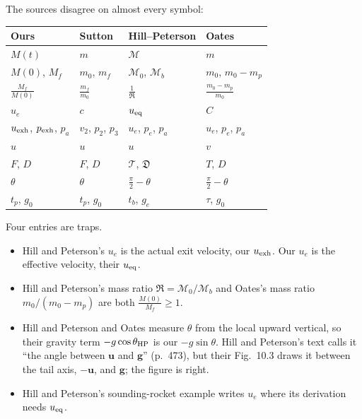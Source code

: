 The sources disagree on almost every symbol:
\begin{center}\small
\begin{tabular}{llll}
Ours & Sutton & Hill--Peterson & Oates\\ \hline
$M(t)$ & $m$ & $\mathcal M$ & $m$\\
$M(0)$, $M_f$ & $m_0$, $m_f$ & $\mathcal M_0$, $\mathcal M_b$
  & $m_0$, $m_0-m_p$\\
$\frac{M_f}{M(0)}$ & $\frac{m_f}{m_0}$ & $\frac1{\mathfrak R}$ & $\frac{m_0-m_p}{m_0}$\\
$u_e$ & $c$ & $u_{\rm eq}$ & $C$\\
$u_{\rm exh}$, $p_{\rm exh}$, $p_a$ & $v_2$, $p_2$, $p_3$
  & $u_e$, $p_e$, $p_a$ & $u_e$, $p_e$, $p_a$\\
$u$ & $u$ & $u$ & $v$\\
$F$, $D$ & $F$, $D$ & $\mathcal T$, $\mathfrak D$ & $T$, $D$\\
$\theta$ & $\theta$ & $\tfrac\pi2-\theta$ & $\tfrac\pi2-\theta$\\
$t_p$, $g_0$ & $t_p$, $g_0$ & $t_b$, $g_e$ & $\tau$, $g_0$\\
\end{tabular}
\end{center}
Four entries are traps.
\begin{itemize}\itemsep1pt
\item Hill and Peterson's $u_e$ is the actual exit velocity, our
  $u_{\rm exh}$. Our $u_e$ is the effective velocity, their $u_{\rm eq}$.
\item Hill and Peterson's mass ratio $\mathfrak R=\mathcal M_0/\mathcal M_b$
  and Oates's mass ratio $m_0/(m_0-m_p)$ are both $\frac{M(0)}{M_f}\ge1$.
\item Hill and Peterson and Oates measure $\theta$ from the local upward
  vertical, so their gravity term $-g\cos\theta_{\rm HP}$ is our
  $-g\sin\theta$. Hill and Peterson's text calls it ``the angle between
  $\mathbf u$ and $\mathbf g$'' (p.~473), but their Fig.~10.3 draws it
  between the tail axis, $-\mathbf u$, and $\mathbf g$; the figure is right.
\item Hill and Peterson's sounding-rocket example writes $u_e$ where its
  derivation needs $u_{\rm eq}$.
\end{itemize}

